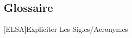 
{}

\thispagestyle{plain}

\vspace*{-1.6cm}
\begin{flushright}
\section*{\fontsize{20pt}{20pt}\selectfont\textnormal{Glossaire}}
\end{flushright}
\vspace{-0.2cm}


\chead[\fancyplain{}{}]
      {\fancyplain{}{}}
\lfoot[\fancyplain{}{\thepage}]
      {\fancyplain{}{}}
\cfoot[\fancyplain{}{}]
      {\fancyplain{}{}}
\rfoot[\fancyplain{}{}]%
     {\fancyplain{}{\thepage}}




\begin{acronym}[ELSA] %
    [ELSA]{Expliciter Les Sigles/Acronymes}
\end{acronym}




